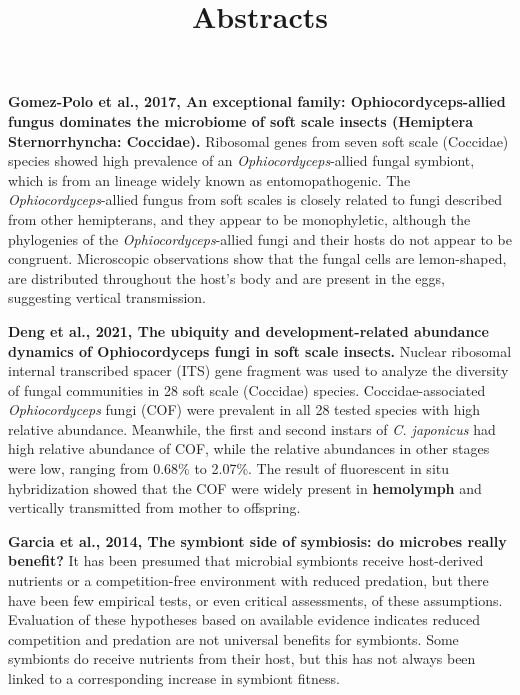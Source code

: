\documentclass[11pt]{article}
\title{Abstracts}
\author{}
\date{}
\begin{document}
\begin{sloppypar}
  \maketitle

  \linenumbers

\textbf{Gomez-Polo et al., 2017, An exceptional family: Ophiocordyceps-allied fungus dominates the microbiome of soft scale insects (Hemiptera Sternorrhyncha: Coccidae).} \newline
Ribosomal genes from seven soft scale (Coccidae) species showed high prevalence of an \textit{Ophiocordyceps}-allied fungal symbiont, which is from an lineage widely known as entomopathogenic. 
The \textit{Ophiocordyceps}-allied fungus from soft scales is closely related to fungi described from other hemipterans, and they appear to be monophyletic, although the phylogenies of the \textit{Ophiocordyceps}-allied fungi and their hosts do not appear to be congruent. 
Microscopic observations show that the fungal cells are lemon-shaped, are distributed throughout the host’s body and are
present in the eggs, suggesting vertical transmission.

\par

\textbf{Deng et al., 2021, The ubiquity and development-related abundance dynamics of Ophiocordyceps fungi in soft scale insects.} \newline
Nuclear ribosomal internal transcribed spacer (ITS) gene fragment was used to analyze the diversity of fungal communities in 28 soft scale (Coccidae) species. 
Coccidae-associated \textit{Ophiocordyceps} fungi (COF) were prevalent in all 28 tested species with high relative abundance. 
Meanwhile, the first and second instars of \textit{C. japonicus} had high relative abundance of COF, while the relative
abundances in other stages were low, ranging from 0.68\% to 2.07\%. 
The result of fluorescent in situ hybridization showed that the COF were widely present in \textbf{hemolymph} and vertically transmitted from mother to offspring. 

\par

\textbf{Garcia et al., 2014, The symbiont side of symbiosis: do microbes really benefit?} \newline
It has been presumed that microbial symbionts receive host-derived nutrients or a competition-free environment with reduced predation, but there have been few empirical tests, or even critical assessments, of these assumptions. 
Evaluation of these hypotheses based on available evidence indicates reduced competition and predation are not universal benefits for symbionts. 
Some symbionts do receive nutrients from their host, but this has not always been linked to a corresponding increase in symbiont fitness.


\end{sloppypar}
\end{document}
